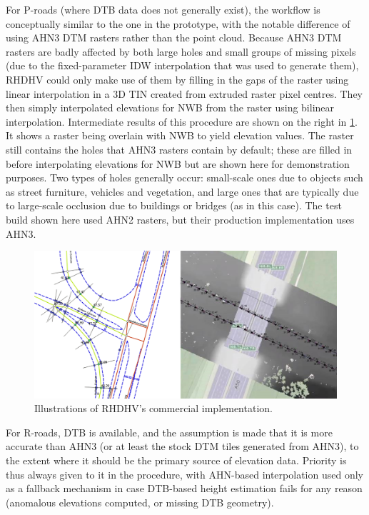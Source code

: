 For P-roads (where DTB data does not generally exist), the workflow is conceptually similar to the one in the prototype, with the notable difference of using AHN3 DTM rasters rather than the point cloud. Because AHN3 DTM rasters are badly affected by both large holes and small groups of missing pixels (due to the fixed-parameter IDW interpolation that was used to generate them), RHDHV could only make use of them by filling in the gaps of the raster using linear interpolation in a 3D TIN created from extruded raster pixel centres. They then simply interpolated elevations for NWB from the raster using bilinear interpolation. Intermediate results of this procedure are shown on the right in \ref{fig:rhdhv}. It shows a raster being overlain with NWB to yield elevation values. The raster still contains the holes that AHN3 rasters contain by default; these are filled in before interpolating elevations for NWB but are shown here for demonstration purposes. Two types of holes generally occur: small-scale ones due to objects such as street furniture, vehicles and vegetation, and large ones that are typically due to large-scale occlusion due to buildings or bridges (as in this case). The test build shown here used AHN2 rasters, but their production implementation uses AHN3.

\begin{figure}
    \centering
    \includegraphics[width=\linewidth]{final_report/figs/rhdhv_combined.png}
    \caption{Illustrations of RHDHV's commercial implementation.}
    \label{fig:rhdhv}
\end{figure}

For R-roads, DTB is available, and the assumption is made that it is more accurate than AHN3 (or at least the stock DTM tiles generated from AHN3), to the extent where it should be the primary source of elevation data. Priority is thus always given to it in the procedure, with AHN-based interpolation used only as a fallback mechanism in case DTB-based height estimation fails for any reason (anomalous elevations computed, or missing DTB geometry).


